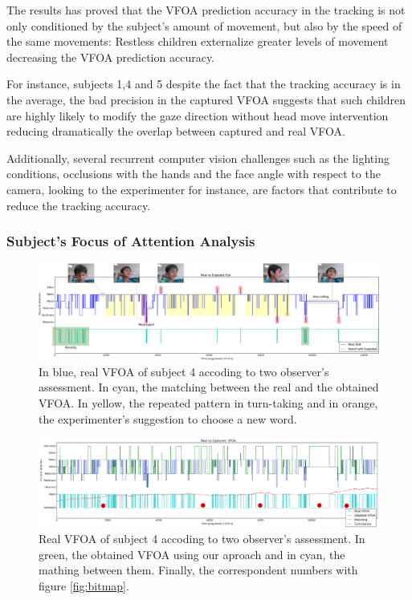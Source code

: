 \documentclass{sig-alternate}
\begin{document}
The results has proved that the VFOA prediction accuracy in the tracking is not
only conditioned by the subject's amount of movement, but also by the speed of
the same movements: Restless children externalize greater levels of movement
decreasing the VFOA prediction accuracy. 

For instance, subjects 1,4 and 5 despite the fact that the tracking accuracy is
in the average, the bad precision in the captured VFOA suggests that such
children are highly likely to modify the gaze direction without head move
intervention reducing dramatically the overlap between captured and real VFOA.

Additionally, several recurrent computer vision challenges such as the lighting
conditions, occlusions with the hands and the face angle with respect to the
camera, looking to the experimenter for instance, are factors that contribute to
reduce the tracking accuracy.

\subsubsection{Subject's Focus of Attention Analysis}

\begin{figure}
    \centering
    \includegraphics[width=1.8\columnwidth]{realExpected}
    \caption{\small In blue, real VFOA of subject 4 accoding to two observer's
    assessment. In cyan, the matching between the real and the obtained VFOA. In
    yellow, the repeated pattern in turn-taking and in orange, the experimenter's
    suggestion to choose a new word.}

    \label{fig:realExpected}
    
\end{figure}

\begin{figure}
    \centering
    \includegraphics[width=1.81\columnwidth]{realCaptured}
    \caption{\small Real VFOA of subject 4 accoding to two observer's
    assessment. In green, the obtained VFOA using our aproach and in cyan, the
    mathing between them. Finally, the correspondent numbers with figure \ref{fig:bitmap}.}

    \label{fig:realCaptured}
\end{figure}
\end{document}
